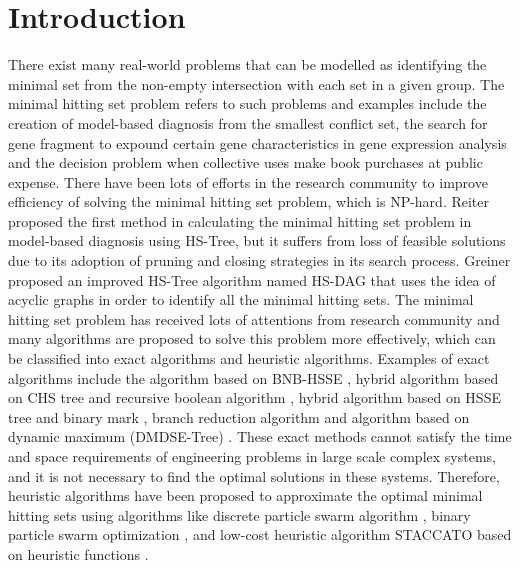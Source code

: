 \section{Introduction}
There exist many real-world problems that can be modelled as identifying the minimal set from the non-empty intersection with each set in a given group.
The minimal hitting set problem refers to such problems and examples include the creation of model-based diagnosis from the smallest conflict set, the search for gene fragment to expound certain gene characteristics in gene expression analysis and the decision problem when collective uses make book purchases at public expense.
There have been lots of efforts in the research community to improve efficiency of solving the minimal hitting set problem, which is NP-hard.
Reiter \citep{c1reiter1987theory} proposed the first method in calculating the minimal hitting set problem in model-based diagnosis using HS-Tree, but it suffers from loss of feasible solutions due to its adoption of pruning and closing strategies in its search process.
Greiner \citep{c2greiner1989correction} proposed an improved HS-Tree algorithm named HS-DAG that uses the idea of acyclic graphs in order to identify all the minimal hitting sets.
The minimal hitting set problem has received lots of attentions from research community and many algorithms are proposed to solve this problem more effectively, which can be classified into exact algorithms and heuristic algorithms.
Examples of exact algorithms include the algorithm based on BNB-HSSE \citep{c3xiaomei}, hybrid algorithm based on CHS tree and recursive boolean algorithm \citep{c4wang2010research}, hybrid algorithm based on HSSE tree and binary mark \citep{c5feng2011method}, branch reduction algorithm \citep{c6shi2010exact} and algorithm based on dynamic maximum (DMDSE-Tree) \citep{c7zhang}.
These exact methods cannot satisfy the time and space requirements of engineering problems in large scale complex systems, and it is not necessary to find the optimal solutions in these systems.
Therefore, heuristic algorithms have been proposed to approximate the optimal minimal hitting sets using algorithms like discrete particle swarm algorithm \citep{c8}, binary particle swarm optimization \citep{c9}, and low-cost heuristic algorithm STACCATO based on heuristic functions \citep{c10}.


